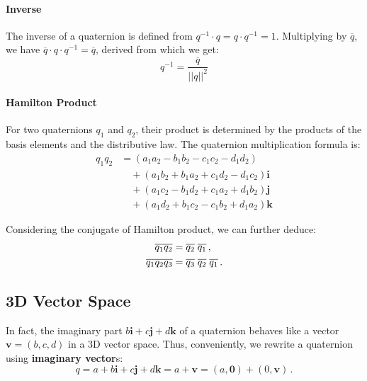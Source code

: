 \documentclass[11pt]{article}
\newcommand{\vect}[1]{\mathbf{#1}\xspace}
\newcommand{\vecti}{\vect{i}\xspace}
\newcommand{\vectj}{\vect{j}\xspace}
\newcommand{\vectk}{\vect{k}\xspace}
\begin{document}
\paragraph{Inverse}
The inverse of a quaternion is defined from $q^{-1} \cdot q = q \cdot q^{-1} = 1$.
Multiplying by $\overline{q}$, we have $\overline{q} \cdot q \cdot q^{-1} = \overline{q}$, derived from which we get:
\begin{equation}\label{equation:inverse_q}
    q^{-1} = \frac{\overline{q}}{{\vert \vert q \vert \vert}^{2}}
\end{equation}

\paragraph{Hamilton Product}
For two quaternions $q_1$ and $q_2$, their product is determined by the products of the basis elements and the distributive law.
The quaternion multiplication formula is:
\begin{align}\label{equation:product}
    q_1  q_2 
    &= (a_1a_2 - b_1b_2 - c_1c_2 -d_1d_2) \nonumber\\
    &\quad + (a_1b_2 + b_1a_2 + c_1d_2 - d_1c_2)\vecti \nonumber\\
    &\quad + (a_1c_2 - b_1d_2 + c_1a_2 + d_1b_2)\vectj \nonumber\\ 
    &\quad + (a_1d_2 + b_1c_2 - c_1b_2 + d_1a_2)\vectk
\end{align}

Considering the conjugate of Hamilton product, we can further deduce:
\begin{align}
    \overline{q_1  q_2} 
    & = \overline{q_2} \hphantom{.} \overline{q_1} \, , \nonumber \\
    \overline{q_1  q_2  q_3} 
    & = \overline{q_3} \hphantom{.} \overline{q_2} \hphantom{.} \overline{q_1} \, .
\end{align}

\subsection{3D Vector Space}
In fact, the imaginary part $b \vecti + c \vectj + d \vectk$ of a quaternion behaves like a vector $\vect{v} = (b, c, d)$ in a 3D vector space.
Thus, conveniently, we rewrite a quaternion using \textbf{imaginary vector}s:
\begin{equation}\label{vector}
    q =	a +  b \vecti + c \vectj + d \vectk = a + \vect{v} = (a, \vect{0}) + (0, \vect{v}) \, .
\end{equation}
\end{document}
